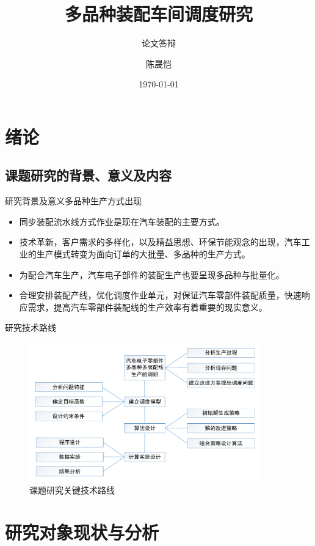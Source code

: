 \documentclass{beamer}
\title{多品种装配车间调度研究}
\subtitle{论文答辩}
\author{陈晟恺}
\institute[diufanshu@gmail.com]{健行理工1001~~201002750102\\ 指导老师：鲁建厦、董巧英 }
\date{\today}
\begin{document}
\newtheorem{thm}{定理}
\begin{frame}
\titlepage
{}
\end{frame}
\section{绪论}
\subsection{课题研究的背景、意义及内容}
\begin{frame}{研究背景及意义}{多品种生产方式出现}
\begin{itemize}[<+-| alert@+>]
\item 同步装配流水线方式作业是现在汽车装配的主要方式。
\item 技术革新，客户需求的多样化，以及精益思想、环保节能观念的出现，汽车工业的生产模式转变为面向订单的大批量、多品种的生产方式。
\item 为配合汽车生产，汽车电子部件的装配生产也要呈现多品种与批量化。
\item 合理安排装配产线，优化调度作业单元，对保证汽车零部件装配质量，快速响应需求，提高汽车零部件装配线的生产效率有着重要的现实意义。
\end{itemize}
\end{frame}

\begin{frame}{研究技术路线}
\begin{figure}
\centering
\includegraphics[width = 10cm]{techroute1.pdf}
\caption{课题研究关键技术路线}
\end{figure}
\end{frame}

\section{研究对象现状与分析}
\end{document}
